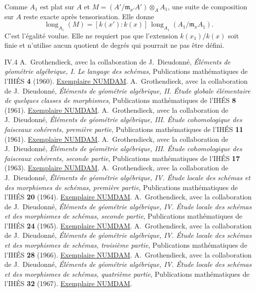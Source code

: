 \documentclass[11pt,a4paper]{article}
\begin{document}
Comme $A_1$ est plat sur $A$ et
$M=(A'/\mathfrak m_{x'}A')\otimes_A A_1$, une suite de composition
sur $A$ reste exacte après tensorisation. Elle donne
\[
 \operatorname{long}_{A_1}(M)
 =[k(x'):k(x)]\,
   \operatorname{long}_{A_1}(A_1/\mathfrak m_xA_1).
\]
C'est l'égalité voulue. Elle ne requiert pas que l'extension
$k(x_1)/k(x)$ soit finie et n'utilise aucun quotient de degrés
qui pourrait ne pas être défini.
\par

\nocite{EGAIII2}

\begin{thebibliography}{IV.4}
 A.~Grothendieck, avec la collaboration de J.~Dieudonné,
\emph{Éléments de géométrie algébrique, I. Le langage des schémas},
Publications mathématiques de l'IHÉS \textbf{4} (1960).
\href{https://numdam.org/item/PMIHES_1960__4__5_0/}{Exemplaire NUMDAM}.
 A.~Grothendieck, avec la collaboration de J.~Dieudonné,
\emph{Éléments de géométrie algébrique, II. Étude globale élémentaire
de quelques classes de morphismes}, Publications mathématiques de
l'IHÉS \textbf{8} (1961).
\href{https://www.numdam.org/item/PMIHES_1961__8__5_0.pdf}{Exemplaire NUMDAM}.
 A.~Grothendieck, avec la collaboration de J.~Dieudonné,
\emph{Éléments de géométrie algébrique, III. Étude cohomologique des
faisceaux cohérents, première partie}, Publications mathématiques de
l'IHÉS \textbf{11} (1961).
\href{https://www.numdam.org/articles/10.1007/BF02684273/}{Exemplaire NUMDAM}.
 A.~Grothendieck, avec la collaboration de J.~Dieudonné,
\emph{Éléments de géométrie algébrique, III. Étude cohomologique des
faisceaux cohérents, seconde partie}, Publications mathématiques de
l'IHÉS \textbf{17} (1963).
\href{https://numdam.org/articles/10.1007/BF02684890/}{Exemplaire NUMDAM}.
 A.~Grothendieck, avec la collaboration de J.~Dieudonné,
\emph{Éléments de géométrie algébrique, IV. Étude locale des schémas et
des morphismes de schémas, première partie}, Publications mathématiques
de l'IHÉS \textbf{20} (1964).
\href{https://numdam.org/articles/10.1007/BF02684747/}{Exemplaire NUMDAM}.
 A.~Grothendieck, avec la collaboration de J.~Dieudonné,
\emph{Éléments de géométrie algébrique, IV. Étude locale des schémas et
des morphismes de schémas, seconde partie}, Publications mathématiques
de l'IHÉS \textbf{24} (1965).
\href{https://numdam.org/articles/10.1007/BF02684322/}{Exemplaire NUMDAM}.
 A.~Grothendieck, avec la collaboration de J.~Dieudonné,
\emph{Éléments de géométrie algébrique, IV. Étude locale des schémas et
des morphismes de schémas, troisième partie}, Publications mathématiques
de l'IHÉS \textbf{28} (1966).
\href{https://numdam.org/articles/10.1007/BF02684343/}{Exemplaire NUMDAM}.
 A.~Grothendieck, avec la collaboration de J.~Dieudonné,
\emph{Éléments de géométrie algébrique, IV. Étude locale des schémas et
des morphismes de schémas, quatrième partie}, Publications mathématiques
de l'IHÉS \textbf{32} (1967).
\href{https://numdam.org/articles/10.1007/BF02732123/}{Exemplaire NUMDAM}.
\end{thebibliography}
\end{document}
